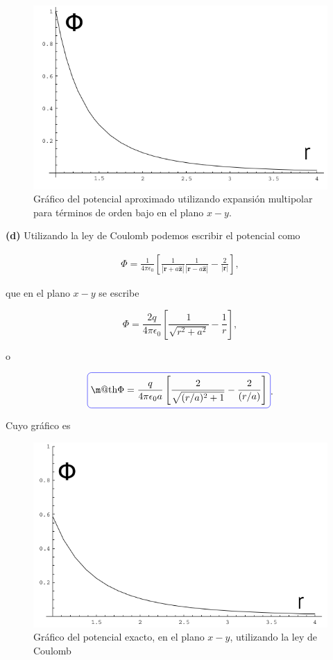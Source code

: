 \documentclass[a4paper,11pt]{article}
\makeatletter
\numberwithin{equation}{section}
\newcommand*{\boxcolor}{blue}
\renewcommand{\boxed}[1]{\textcolor{\boxcolor}{%
\tikz[baseline={([yshift=-1ex]current bounding box.center)}] \node [rectangle, minimum width=1ex,rounded corners,draw] {\normalcolor\m@th$\displaystyle#1$};}}
\makeatother
\begin{document}
\begin{figure}[H]
\center 
\includegraphics[scale=0.6]{problema1fig2}
\caption{Gráfico del potencial aproximado utilizando expansión multipolar 
para términos de orden bajo en el plano $x-y$.}
\end{figure}

\textbf{(d)} Utilizando la ley de Coulomb podemos escribir el potencial como

\begin{align*}
 \Phi = \frac{1}{4\pi\epsilon_0}\left[\frac{1}{|\mathbf{r} + a\hat{\mathbf{z}}|}
 \frac{1}{|\mathbf{r} - a\hat{\mathbf{z}}|} - \frac{2}{|\mathbf{r}|} \right],
\end{align*}

que en el plano $x-y$ se escribe 

\begin{equation}
 \Phi = \frac{2q}{4\pi\epsilon_0}\left[\frac{1}{\sqrt{r^2+a^2}} - \frac{1}{r} \right],
\end{equation}

o 

\begin{equation}
 \boxed{\Phi = \frac{q}{4\pi\epsilon_0 a}\left[\frac{2}{\sqrt{(r/a)^2 + 1}} - 
 \frac{2}{(r/a)}\right]}.
\end{equation}

\newpage

Cuyo gráfico es 

\begin{figure}[H]
\center 
\includegraphics[scale=0.6]{problema1fig3}
\caption{Gráfico del potencial exacto, en el plano $x-y$,
utilizando la ley de Coulomb}
\end{figure}
\end{document}
